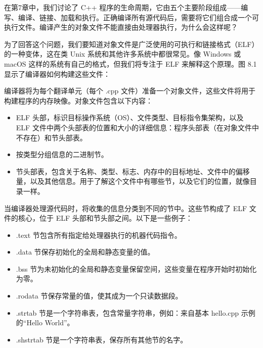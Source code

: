 在第7章中，我们讨论了 C++ 程序的生命周期，它由五个主要阶段组成——编写、编译、链接、加载和执行。正确编译所有源代码后，需要将它们组合成一个可执行文件。编译产生的对象文件不能直接由处理器执行，为什么会这样呢？

为了回答这个问题，我们要知道对象文件是广泛使用的可执行和链接格式（ELF）的一种变体，这在类 Unix 系统和其他许多系统中都很常见。像 Windows 或 macOS 这样的系统有自己的格式，但我们将专注于 ELF 来解释这个原理。图 8.1 显示了编译器如何构建这些文件：


编译器将为每个翻译单元（每个 .cpp 文件）准备一个对象文件，这些文件将用于构建程序的内存映像。对象文件包含以下内容：

\begin{itemize}
\item
ELF 头部，标识目标操作系统（OS）、文件类型、目标指令集架构，以及 ELF 文件中两个头部表的位置和大小的详细信息：程序头部表（在对象文件中不存在）和节头部表。

\item
按类型分组信息的二进制节。

\item
节头部表，包含关于名称、类型、标志、内存中的目标地址、文件中的偏移量，以及其他信息。用于了解这个文件中有哪些节，以及它们的位置，就像目录一样。
\end{itemize}

当编译器处理源代码时，将收集的信息分类到不同的节中。这些节构成了 ELF 文件的核心，位于 ELF 头部和节头部之间。以下是一些例子：

\begin{itemize}
\item
.text 节包含所有指定给处理器执行的机器代码指令。

\item
.data 节保存初始化的全局和静态变量的值。

\item
.bss 节为未初始化的全局和静态变量保留空间，这些变量在程序开始时初始化为零。

\item
.rodata 节保存常量的值，使其成为一个只读数据段。

\item
.strtab 节是一个字符串表，包含常量字符串，例如：来自基本 hello.cpp 示例的“Hello World”。

\item
.shstrtab 节是一个字符串表，保存所有其他节的名字。
\end{itemize}

